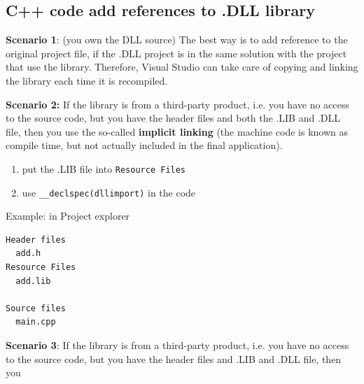 \subsection{C++ code add references to .DLL library}

{\bf Scenario 1}: (you own the DLL source) The best way is to add reference to
the original project file, if the .DLL project is in the same solution with the
project that use the library.
Therefore, Visual Studio can take care of copying and linking the library each
time it is recompiled.

{\bf Scenario 2:} If the library is from a third-party product, i.e. you have no
access to the source code, but you have the header files and both the .LIB and
.DLL file, then you use the so-called {\bf implicit linking} (the machine code
is known as compile time, but not actually included in the final application).
\begin{enumerate}
  \item put the .LIB file into \verb!Resource Files!
  \item use \verb!__declspec(dllimport)! in the code
    
\end{enumerate}
Example: in Project explorer
\begin{verbatim}
Header files
  add.h
Resource Files
  add.lib
  
Source files
  main.cpp
\end{verbatim}

{\bf Scenario 3}: If the library is from a third-party product, i.e. you have no
access to the source code, but you have the header files and .LIB and .DLL file, then you

